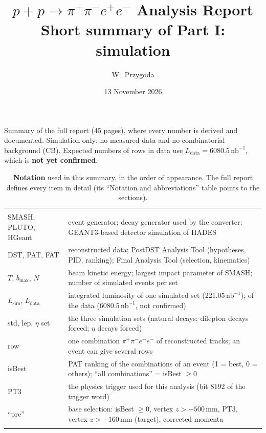 \documentclass[11pt,a4paper]{article}
\title{\Large $p + p \to \pi^{+}\pi^{-}e^{+}e^{-}$ Analysis Report\\[0.3em]
       \normalsize Short summary of Part I: simulation}
\author{W.~Przygoda}
\date{13 November 2026}
\renewcommand{\arraystretch}{1.15}
\newcommand{\pip}{\ensuremath{\pi^{+}}\xspace}
\newcommand{\pim}{\ensuremath{\pi^{-}}\xspace}
\newcommand{\nbinv}{\ensuremath{\mathrm{nb}^{-1}}\xspace}
\newcommand{\Lsim}{\ensuremath{L_{\mathrm{sim}}}\xspace}
\newcommand{\Ldata}{\ensuremath{L_{\mathrm{data}}}\xspace}
\newcommand{\code}[1]{\texttt{\detokenize{#1}}}
\newcommand{\notebox}[1]{\par\noindent\colorbox{orange!10}{\parbox{\dimexpr\linewidth-2\fboxsep\relax}{#1}}\par}
\begin{document}
\maketitle

\notebox{Summary of the full report \code{report.pdf} (45 pages), where every number is derived and
documented. Simulation only: no measured data and no combinatorial background (CB). Expected numbers
of rows in data use $\Ldata = 6080.5\,\nbinv$, which is \textbf{not yet confirmed}.}

{\footnotesize
\setlength{\tabcolsep}{4pt}
\renewcommand{\arraystretch}{1.08}
\begin{longtable}{@{}>{\raggedright\arraybackslash}p{3.3cm} >{\raggedright\arraybackslash}p{\dimexpr\textwidth-3.3cm-2\tabcolsep\relax}@{}}
\caption{\textbf{Notation} used in this summary, in the order of appearance. The full report defines
every item in detail (its ``Notation and abbreviations'' table points to the sections).}
\label{tab:nota}\\
\toprule
\multicolumn{2}{@{}l}{\textbf{Samples and normalisation}} \\
SMASH, PLUTO, HGeant & event generator; decay generator used by the converter; GEANT3-based detector simulation of HADES \\
DST, PAT, FAT & reconstructed data; PostDST Analysis Tool (hypotheses, PID, ranking); Final Analysis Tool (selection, kinematics) \\
$T$, $b_{\max}$, $N$ & beam kinetic energy; largest impact parameter of SMASH; number of simulated events per set \\
\Lsim, \Ldata & integrated luminosity of one simulated set (221.05\,\nbinv); of the data (6080.5\,\nbinv, not confirmed) \\
std, lep, $\eta$ set & the three simulation sets (natural decays; dilepton decays forced; $\eta$ decays forced) \\
row & one combination \pip\pim$e^+e^-$ of reconstructed tracks; an event can give several rows \\
isBest & PAT ranking of the combinations of an event (1 = best, 0 = others); ``all combinations'' = isBest $\ge 0$ \\
PT3 & the physics trigger used for this analysis (bit 8192 of the trigger word) \\
``pre'' & base selection: isBest $\ge0$, vertex $z>-500$\,mm, PT3, vertex $z>-160$\,mm (target), corrected momenta \\
\midrule
\multicolumn{2}{@{}l}{\textbf{Cross sections and counts}} \\

\end{longtable}}
\end{document}
